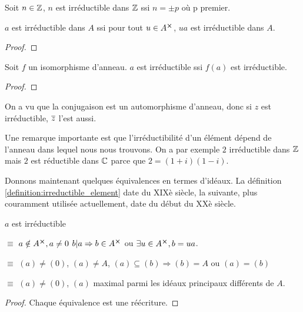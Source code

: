 \begin{exemple}
	Soit $n \in \mathbb{Z}$, $n$ est irréductible dans $\mathbb{Z}$ ssi $n = \pm p$
	où p premier.
\end{exemple}

\begin{proposition}
	$a$ est irréductible dans $A$ ssi pour tout $u \in A^{\cross}$, $ua$ est
	irréductible dans $A$.
\end{proposition}

\ifdefined\outputproof
\begin{proof}

\end{proof}
\fi

\begin{proposition}
	Soit $f$ un isomorphisme d'anneau. $a$ est irréductible ssi $f(a)$ est
	irréductible.
\end{proposition}

\ifdefined\outputproof
\begin{proof}

\end{proof}
\fi

\begin{exemple}
	On a vu que la conjugaison est un automorphisme d'anneau, donc si $z$ est
	irréductible, $\overline{z}$ l'est aussi.
\end{exemple}

Une remarque importante est que l'irréductibilité d'un élément dépend de l'anneau
dans lequel nous nous trouvons. On a par exemple $2$ irréductible dans
$\mathbb{Z}$ mais $2$ est réductible dans $\mathbb{C}$ parce que $2 = (1 + i) (1 -
i)$.

Donnons maintenant quelques équivalences en termes d'idéaux. La définition
\ref{definition:irreductible_element} date du XIXè siècle, la suivante, plus couramment
utilisée actuellement, date du début du XXè siècle.

\begin{proposition}
	$a$ est irréductible

	$\equiv$
	$a \notin A^{\cross}, a \ne 0$ $b | a \Rightarrow b \in A^{\cross}$ ou $\exists u \in
	A^{\cross}, b = ua$.

	$\equiv$
	$(a) \ne (0)$, $(a) \ne A$, $(a) \subseteq (b) \Rightarrow (b) = A$ ou $(a)
	= (b)$

	$\equiv$
	$(a) \ne (0)$, $(a)$ maximal parmi les idéaux principaux différents de $A$.
\end{proposition}

\ifdefined\outputproof
\begin{proof}
	Chaque équivalence est une réécriture.
\end{proof}
\fi

